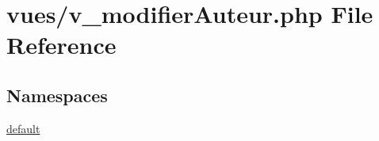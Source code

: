 \hypertarget{v__modifier_auteur_8php}{}\section{vues/v\+\_\+modifier\+Auteur.php File Reference}
\label{v__modifier_auteur_8php}
\subsection*{Namespaces}
\begin{DoxyCompactItemize}
\item 
 \hyperlink{namespacedefault}{default}
\end{DoxyCompactItemize}
